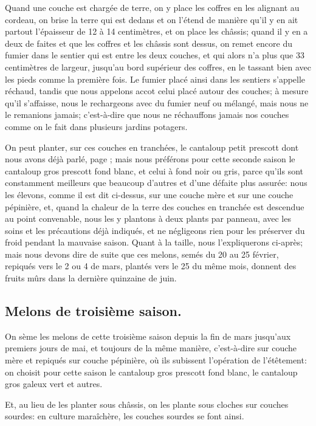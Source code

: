 \documentclass[10pt,a4paper]{book}
\begin{document}
Quand une couche est chargée de terre, on y place les coffres en les alignant au cordeau, on brise la terre qui est dedans et on l'étend de manière qu'il y en ait partout l'épaisseur de 12 à 14 centimètres, et on place les châssis; quand il y en a deux de faites et que les coffres et les châssis sont dessus, on remet encore du fumier dans le sentier qui est entre les deux couches, et qui alors n'a plus que 33 centimètres de largeur, jusqu'au bord supérieur des coffres, en le tassant bien avec les pieds comme la première fois. Le fumier placé ainsi dans les sentiers s'appelle réchaud, tandis que nous appelons accot celui placé autour des couches; à mesure qu'il s'affaisse, nous le rechargeons avec du fumier neuf ou mélangé, mais nous ne le remanions jamais; c'est-à-dire que nous ne réchauffons jamais nos couches comme on le fait dans plusieurs jardins potagers.

On peut planter, sur ces couches en tranchées, le cantaloup petit prescott dont nous avons déjà parlé, page \pageref{plantationpetitprescott}; mais nous préférons pour cette seconde saison le cantaloup gros prescott fond blanc, et celui à fond noir ou gris, parce qu'ils sont constamment meilleurs que beaucoup d'autres et d'une défaite plus assurée: nous les élevons, comme il est dit ci-dessus, sur une couche mère et sur une couche pépinière, et, quand la chaleur de la terre des couches en tranchée est descendue au point convenable, nous les y plantons à deux plants par panneau, avec les soins et les précautions déjà indiqués, et ne négligeons rien pour les préserver du froid pendant la mauvaise saison. Quant à la taille, nous l'expliquerons ci-après; mais nous devons dire de suite que ces melons, semés du 20 au 25 février, repiqués vers le 2 ou 4 de mars, plantés vers le 25 du même mois, donnent des fruits mûrs dans la dernière quinzaine de juin.

\subsection{Melons de troisième saison.}

On sème les melons de cette troisième saison depuis la fin de mars jusqu'aux premiers jours de mai, et toujours de la même manière, c'est-à-dire sur couche mère et repiqués sur couche pépinière, où ils subissent l'opération de l'étêtement: on choisit pour cette saison le cantaloup gros prescott fond blanc, le cantaloup gros galeux vert et autres.

Et, au lieu de les planter sous châssis, on les plante sous cloches sur couches sourdes: en culture maraîchère, les couches sourdes se font ainsi.
\end{document}
